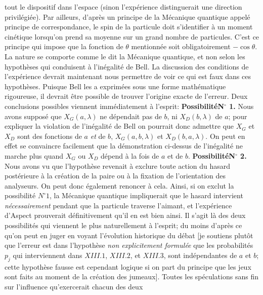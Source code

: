 tout le dispositif dans l'espace (sinon l'exp\'erience distinguerait une 
direction  privil\'egi\'ee). Par ailleurs, d'apr\`es un principe de la 
M\'ecanique  quantique appel\'e principe de correspondance, le spin de la 
particule  doit s'identifier \`a un moment cin\'etique lorsqu'on prend sa 
moyenne  sur un grand nombre de particules. C'est ce principe qui impose 
que la fonction de  $\theta$ mentionn\'ee soit obligatoirement  
$-\cos\theta$.  
\medskip 
La nature se comporte comme le dit la M\'ecanique quantique, et non 
selon les hypoth\`eses qui conduisent \`a l'in\'egalit\'e  de Bell. La  
discussion des conditions de l'exp\'erience devrait maintenant nous 
permettre de voir ce qui est faux dans ces hypoth\`eses. Puisque Bell les  
a exprim\'ees sous une forme math\'ematique rigoureuse, il devrait  
\^etre possible de trouver l'origine exacte de l'erreur. Deux conclusions 
possibles viennent imm\'ediatement \`a l'esprit: 
\smallskip 
{\bf Possibilit\'e\a\a N${}^\circ\!\!$ 1.} Nous avons suppos\'e que
$X_G(a,\lambda )$ ne d\'ependait pas de $b$,  ni $X_D(b,\lambda )$ de $a$; 
pour expliquer la violation de l'in\'egalit\'e   de Bell on pourrait donc
admettre que $X_G$ et $X_D$ sont des fonctions  de  $a$ {\it et} de $b$, 
$X_G(a,b,\lambda )$ et $X_D(b,a,\lambda )$.  On peut  en effet se convaincre
facilement que la d\'emonstration ci-dessus de  l'in\'egalit\'e ne marche
plus quand $X_G$ ou $X_D$ d\'epend \`a la fois  de $a$ et de $b$. 
\smallskip 
{\bf Possibilit\'e\a\a N${}^\circ\!\!$ 2.} Nous avons vu que l'hypoth\`ese
revenait \`a exclure toute action du hasard post\'erieure \`a la cr\'eation
de la paire ou \`a la fixation de l'orientation des analyseurs. On peut
donc \'egalement renoncer \`a cela.  Ainsi, si on exclut la possibilit\'e
$N^\circ 1$,  la M\'ecanique quantique impliquerait que le hasard intervient
{\it n\'ecessairement} pendant que la particule traverse l'aimant, et
l'exp\'erience d'Aspect prouverait  d\'efinitivement qu'il en est bien ainsi. 
\medskip 
Il s'agit l\`a des deux possibilit\'es qui viennent le plus naturellement
\`a l'esprit;  du moins d'apr\`es ce qu'on peut en juger en voyant
l'\'evolution historique du d\'ebat [je soutiens plut\^ot que l'erreur
est dans l'hypoth\`ese {\it non explicitement formul\'ee} que les
probabilit\'es $p_j$ qui interviennent dans $XIII.1$, $XIII.2$, et
$XIII.3$, sont ind\'ependantes  de $a$ et $b$;  cette hypoth\`ese fausse
est cependant logique si on part du principe que les jeux sont faits au
moment de la cr\'eation des jumeaux].  Toutes les sp\'eculations
sans fin sur {\og l'influence \fg} qu'exercerait chacun des deux
